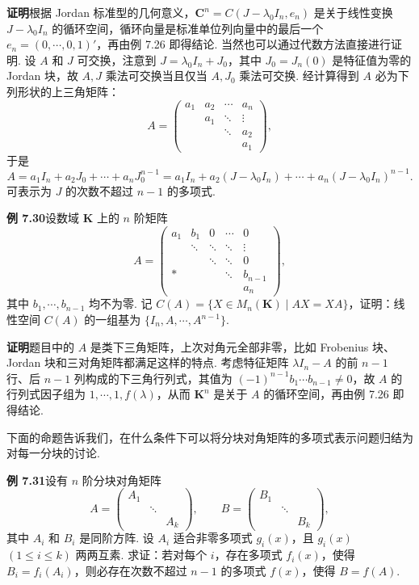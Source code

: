 \documentclass[UTF8,12pt,a4paper,fontset=fandol]{ctexart}
\begin{document}
\noindent\textbf{证明}\quad 根据 Jordan 标准型的几何意义，$\mathbf{C}^n=C(J-\lambda_0I_n,e_n)$ 是关于线性变换 $J-\lambda_0I_n$ 的循环空间，循环向量是标准单位列向量中的最后一个 $e_n=(0,\cdots,0,1)'$，再由例 7.26 即得结论. 当然也可以通过代数方法直接进行证明. 设 $A$ 和 $J$ 可交换，注意到 $J=\lambda_0I_n+J_0$，其中 $J_0=J_n(0)$ 是特征值为零的 Jordan 块，故 $A,J$ 乘法可交换当且仅当 $A,J_0$ 乘法可交换. 经计算得到 $A$ 必为下列形状的上三角矩阵：
\[
A=\left(\begin{array}{ccccc}
a_1 & a_2 & \cdots & a_n\\
    & a_1 & \ddots & \vdots\\
    &     & \ddots & a_2\\
    &     &        & a_1
\end{array}\right),
\]
于是
\[
A=a_1I_n+a_2J_0+\cdots+a_nJ_0^{n-1}
=a_1I_n+a_2(J-\lambda_0I_n)+\cdots+a_n(J-\lambda_0I_n)^{n-1}.
\]
可表示为 $J$ 的次数不超过 $n-1$ 的多项式.

\noindent\textbf{例 7.30}\quad 设数域 $\mathbf{K}$ 上的 $n$ 阶矩阵
\[
A=
\left(\begin{array}{ccccc}
a_1 & b_1 & 0 & \cdots & 0\\
    & \ddots & \ddots & \ddots & \vdots\\
    &        & \ddots & \ddots & 0\\
*   &        &        & \ddots & b_{n-1}\\
    &        &        &        & a_n
\end{array}\right),
\]
其中 $b_1,\cdots,b_{n-1}$ 均不为零. 记 $C(A)=\{X\in M_n(\mathbf{K})\mid AX=XA\}$，证明：线性空间 $C(A)$ 的一组基为 $\{I_n,A,\cdots,A^{n-1}\}$.

\noindent\textbf{证明}\quad 题目中的 $A$ 是类下三角矩阵，上次对角元全部非零，比如 Frobenius 块、Jordan 块和三对角矩阵都满足这样的特点. 考虑特征矩阵 $\lambda I_n-A$ 的前 $n-1$ 行、后 $n-1$ 列构成的下三角行列式，其值为 $(-1)^{n-1}b_1\cdots b_{n-1}\ne 0$，故 $A$ 的行列式因子组为 $1,\cdots,1,f(\lambda)$，从而 $\mathbf{K}^n$ 是关于 $A$ 的循环空间，再由例 7.26 即得结论.

下面的命题告诉我们，在什么条件下可以将分块对角矩阵的多项式表示问题归结为对每一分块的讨论.

\noindent\textbf{例 7.31}\quad 设有 $n$ 阶分块对角矩阵
\[
A=\left(\begin{array}{ccc}
A_1 &        &  \\
    & \ddots &  \\
    &        & A_k
\end{array}\right),\qquad
B=\left(\begin{array}{ccc}
B_1 &        &  \\
    & \ddots &  \\
    &        & B_k
\end{array}\right),
\]
其中 $A_i$ 和 $B_i$ 是同阶方阵. 设 $A_i$ 适合非零多项式 $g_i(x)$，且 $g_i(x)$ $(1\le i\le k)$ 两两互素. 求证：若对每个 $i$，存在多项式 $f_i(x)$，使得 $B_i=f_i(A_i)$，则必存在次数不超过 $n-1$ 的多项式 $f(x)$，使得 $B=f(A)$.
\end{document}

